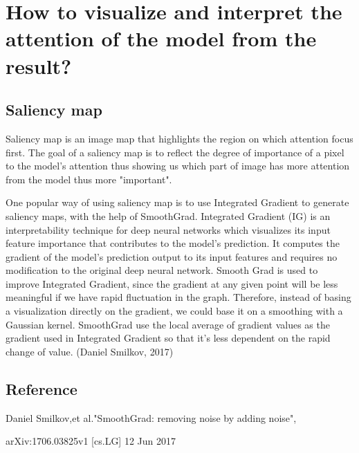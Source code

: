 \documentclass{article}
\begin{document}
\section{How to visualize and interpret the attention of the model from the result?}
\subsection{Saliency map}
Saliency map is an image map that highlights the region on which attention focus first. The goal of a saliency map is to reflect the degree of importance of a pixel to the model's attention thus showing us which part of image has more attention from the model thus more "important".

One popular way of using saliency map is to use Integrated Gradient to generate saliency maps, with the help of SmoothGrad. Integrated Gradient (IG) is an interpretability technique for deep neural networks which visualizes its input feature importance that contributes to the model's prediction. It computes the gradient of the model’s prediction output to its input features and requires no modification to the original deep neural network.
Smooth Grad is used to improve Integrated Gradient, since the gradient at any given point will be less meaningful if we have rapid fluctuation in the graph. Therefore, instead of basing a visualization directly on the gradient, we could base it on a smoothing with a Gaussian kernel. SmoothGrad use the local average of gradient values as the gradient used in Integrated Gradient so that it’s less dependent on the rapid change of value. (Daniel Smilkov, 2017)

\subsection{Reference}
Daniel Smilkov,et al."SmoothGrad: removing noise by adding noise",


arXiv:1706.03825v1 [cs.LG] 12 Jun 2017
\end{document}
